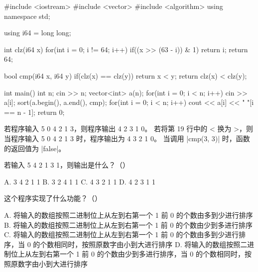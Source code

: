 \documentclass{cspexam}
\begin{document}

\begin{ncode}
#include <iostream>
#include <vector>
#include <algorithm>
using namespace std;

using i64 = long long;

int clz(i64 x)
{
    for(int i = 0; i != 64; i++)
        if((x >> (63 - i)) & 1)
            return i;
    return 64;
}

bool cmp(i64 x, i64 y)
{
    if(clz(x) == clz(y))
        return x < y;
    return clz(x) < clz(y);
}

int main()
{
    int n;
    cin >> n;
    vector<int> a(n);
    for(int i = 0; i < n; i++)
        cin >> a[i];
    sort(a.begin(), a.end(), cmp);
    for(int i = 0; i < n; i++)
        cout << a[i] << " \n"[i == n - 1];
    return 0;
}
\end{ncode}


\Q 若程序输入 5 0 4 2 1 3，则程序输出 4 2 3 1 0。\tfend
\Q 若将第 19 行中的 < 换为 >，则当程序输入 5 0 4 2 1 3 时，程序输出为 4 3 2 1 0。\tfend
\Q 当调用 \co|cmp(3, 3)| 时，函数的返回值为 \co|false|。\tfend


\Q 若输入 5 4 2 1 3 1，则输出是什么？（\quad）
\begin{optrow}
\op A. 3 4 2 1 1 \op B. 3 2 4 1 1 \op C. 4 3 2 1 1 \op D. 4 2 3 1 1
\end{optrow}

\Q 这个程序实现了什么功能？（\quad）
\begin{optcol}
\op A. 将输入的数组按照二进制位上从左到右第一个 1 前 0 的个数由多到少进行排序
\op B. 将输入的数组按照二进制位上从左到右第一个 1 前 0 的个数由少到多进行排序
\op C. 将输入的数组按照二进制位上从左到右第一个 1 前 0 的个数由多到少进行排序，当 0 的个数相同时，按照原数字由小到大进行排序
\op D. 将输入的数组按照二进制位上从左到右第一个 1 前 0 的个数由少到多进行排序，当 0 的个数相同时，按照原数字由小到大进行排序
\end{optcol}
\end{document}
